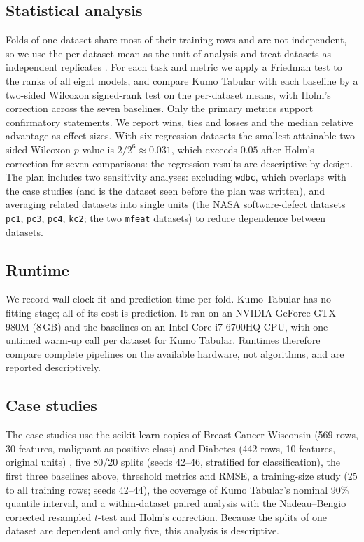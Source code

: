 \subsection{Statistical analysis}
\label{sec:design-stats}
Folds of one dataset share most of their training rows and are not independent, so we use the per-dataset mean as the
unit of analysis and treat datasets as independent replicates \citep{demsar2006comparisons}. For each task and metric
we apply a Friedman test \citep{friedman1937ranks} to the ranks of all eight models, and compare Kumo Tabular with each
baseline by a two-sided Wilcoxon signed-rank test on the per-dataset means, with Holm's correction \citep{holm1979}
across the seven baselines. Only the primary metrics support confirmatory statements. We report wins, ties and losses
and the median relative advantage as effect sizes. With six regression datasets the smallest attainable two-sided
Wilcoxon $p$-value is $2/2^6\approx0.031$, which exceeds $0.05$ after Holm's correction for seven comparisons: the
regression results are descriptive by design. The plan includes two sensitivity analyses: excluding \texttt{wdbc},
which overlaps with the case studies (and is the dataset seen before the plan was written), and averaging related datasets into single units (the NASA software-defect
datasets \texttt{pc1}, \texttt{pc3}, \texttt{pc4}, \texttt{kc2}; the two \texttt{mfeat} datasets) to reduce
dependence between datasets.

\subsection{Runtime}
We record wall-clock fit and prediction time per fold. Kumo Tabular has no fitting stage; all of its cost is
prediction. It ran on an NVIDIA GeForce GTX 980M (8\,GB) and the baselines on an Intel Core i7-6700HQ CPU, with one
untimed warm-up call per dataset for Kumo Tabular. Runtimes therefore compare complete pipelines on the available
hardware, not algorithms, and are reported descriptively.

\subsection{Case studies}
\label{sec:design-case}
The case studies use the scikit-learn copies of Breast Cancer Wisconsin (569 rows, 30 features, malignant as positive
class) and Diabetes (442 rows, 10 features, original units) \citep{street1993nuclear,efron2004lars}, five 80/20 splits
(seeds 42--46, stratified for classification), the first three baselines above, threshold metrics and RMSE, a
training-size study (25 to all training rows; seeds 42--44), the coverage of Kumo Tabular's nominal 90\% quantile
interval, and a within-dataset paired analysis with the Nadeau--Bengio corrected resampled $t$-test
\citep{nadeau2003inference} and Holm's correction. Because the splits of one dataset are dependent and only five, this
analysis is descriptive.

